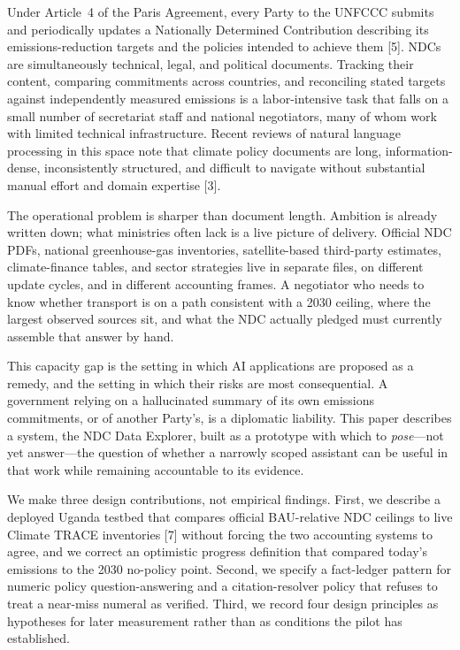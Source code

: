 \documentclass{article}
\begin{document}
Under Article~4 of the Paris Agreement, every Party to the UNFCCC submits and periodically updates a Nationally Determined Contribution describing its emissions-reduction targets and the policies intended to achieve them [5]. NDCs are simultaneously technical, legal, and political documents. Tracking their content, comparing commitments across countries, and reconciling stated targets against independently measured emissions is a labor-intensive task that falls on a small number of secretariat staff and national negotiators, many of whom work with limited technical infrastructure. Recent reviews of natural language processing in this space note that climate policy documents are long, information-dense, inconsistently structured, and difficult to navigate without substantial manual effort and domain expertise [3].

The operational problem is sharper than document length. Ambition is already written down; what ministries often lack is a live picture of delivery. Official NDC PDFs, national greenhouse-gas inventories, satellite-based third-party estimates, climate-finance tables, and sector strategies live in separate files, on different update cycles, and in different accounting frames. A negotiator who needs to know whether transport is on a path consistent with a 2030 ceiling, where the largest observed sources sit, and what the NDC actually pledged must currently assemble that answer by hand.

This capacity gap is the setting in which AI applications are proposed as a remedy, and the setting in which their risks are most consequential. A government relying on a hallucinated summary of its own emissions commitments, or of another Party's, is a diplomatic liability. This paper describes a system, the NDC Data Explorer, built as a prototype with which to \emph{pose}---not yet answer---the question of whether a narrowly scoped assistant can be useful in that work while remaining accountable to its evidence.

We make three design contributions, not empirical findings. First, we describe a deployed Uganda testbed that compares official BAU-relative NDC ceilings to live Climate TRACE inventories [7] without forcing the two accounting systems to agree, and we correct an optimistic progress definition that compared today's emissions to the 2030 no-policy point. Second, we specify a fact-ledger pattern for numeric policy question-answering and a citation-resolver policy that refuses to treat a near-miss numeral as verified. Third, we record four design principles as hypotheses for later measurement rather than as conditions the pilot has established.
\end{document}
